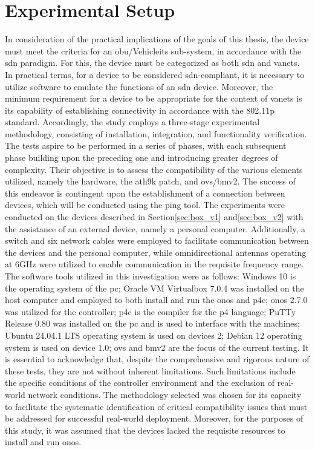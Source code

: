 \section{Experimental Setup}
In consideration of the practical implications of the goals of this thesis, the device must meet the criteria for an \gls{obu}/Vehicle\gls{its} sub-system, in accordance with the \gls{sdn} paradigm. For this, the device must be categorized as both \gls{sdn} and \glspl{vanet}. In practical terms, for a device to be considered \gls{sdn}-compliant, it is necessary to utilize software to emulate the functions of an \gls{sdn} device. Moreover, the minimum requirement for a device to be appropriate for the context of \glspl{vanet} is its capability of establishing connectivity in accordance with the 802.11p standard.
Accordingly, the study employs a three-stage experimental methodology, consisting of installation, integration, and functionality verification. The tests aspire to be performed in a series of phases, with each subsequent phase building upon the preceding one and introducing greater degrees of complexity. Their objective is to assess the compatibility of the various elements utilized, namely the hardware, the ath9k patch, and \gls{ovs}/\gls{bmv2}. The success of this endeavor is contingent upon the establishment of a connection between devices, which will be conducted using the ping tool.
The experiments were conducted on the devices described in Section\ref{sec:box_v1} and\ref{sec:box_v2} with the assistance of an external device, namely a personal computer. Additionally, a switch and six network cables were employed to facilitate communication between the devices and the personal computer, while omnidirectional antennas operating at 6GHz were utilized to enable communication in the requisite frequency range.
The software tools utilized in this investigation were as follows:
Windows 10 is the operating system of the \gls{pc};
Oracle VM Virtualbox 7.0.4 was installed on the host computer and employed to both install and run the \gls{onos} and p4c;
\gls{onos} 2.7.0 was utilized for the controller;
p4c is the compiler for the \gls{p4} language;
PuTTy Release 0.80 was installed on the \gls{pc} and is used to interface with the machines;
Ubuntu 24.04.1 LTS operating system is used on devices 2;
Debian 12 operating system is used on device 1.0;
\gls{ovs} and \gls{bmv2} are the focus of the current testing.
It is essential to acknowledge that, despite the comprehensive and rigorous nature of these tests, they are not without inherent limitations. Such limitations include the specific conditions of the controller environment and the exclusion of real-world network conditions. The methodology selected was chosen for its capacity to facilitate the systematic identification of critical compatibility issues that must be addressed for successful real-world deployment. Moreover, for the purposes of this study, it was assumed that the devices lacked the requisite resources to install and run \gls{onos}.


